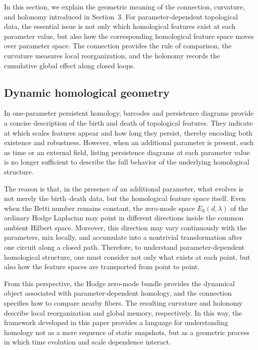 \documentclass[pdflatex,sn-mathphys-num]{sn-jnl}%
\theoremstyle{thmstyleone}%
\theoremstyle{thmstyletwo}%
\theoremstyle{thmstylethree}%
\begin{document}
In this section, we explain the geometric meaning of the connection, curvature, and holonomy introduced in Section~3. For parameter-dependent topological data, the essential issue is not only which homological features exist at each parameter value, but also how the corresponding homological feature space moves over parameter space. The connection provides the rule of comparison, the curvature measures local reorganization, and the holonomy records the cumulative global effect along closed loops.

\subsection{Dynamic homological geometry}

In one-parameter persistent homology, barcodes and persistence diagrams provide a concise description of the birth and death of topological features. They indicate at which scales features appear and how long they persist, thereby encoding both existence and robustness. However, when an additional parameter is present, such as time or an external field, listing persistence diagrams at each parameter value is no longer sufficient to describe the full behavior of the underlying homological structure.

The reason is that, in the presence of an additional parameter, what evolves is not merely the birth--death data, but the homological feature space itself. Even when the Betti number remains constant, the zero-mode space \(E_0(d,\lambda)\) of the ordinary Hodge Laplacian may point in different directions inside the common ambient Hilbert space. Moreover, this direction may vary continuously with the parameters, mix locally, and accumulate into a nontrivial transformation after one circuit along a closed path. Therefore, to understand parameter-dependent homological structure, one must consider not only what exists at each point, but also how the feature spaces are transported from point to point.

From this perspective, the Hodge zero-mode bundle provides the dynamical object associated with parameter-dependent homology, and the connection specifies how to compare nearby fibers. The resulting curvature and holonomy describe local reorganization and global memory, respectively. In this way, the framework developed in this paper provides a language for understanding homology not as a mere sequence of static snapshots, but as a geometric process in which time evolution and scale dependence interact.
\end{document}
